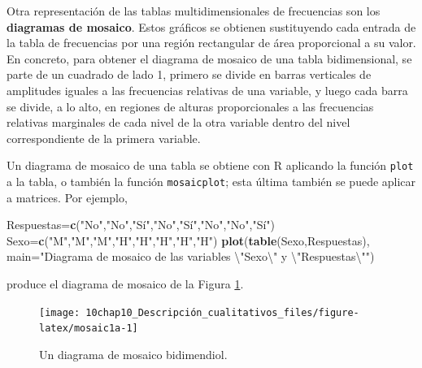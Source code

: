 \documentclass[
]{book}
\newenvironment{Shaded}{\begin{snugshade}}{\end{snugshade}}
\newcommand{\CharTok}[1]{\textcolor[rgb]{0.31,0.60,0.02}{#1}}
\newcommand{\DataTypeTok}[1]{\textcolor[rgb]{0.13,0.29,0.53}{#1}}
\newcommand{\KeywordTok}[1]{\textcolor[rgb]{0.13,0.29,0.53}{\textbf{#1}}}
\newcommand{\NormalTok}[1]{#1}
\newcommand{\StringTok}[1]{\textcolor[rgb]{0.31,0.60,0.02}{#1}}
\theoremstyle{definition}
\theoremstyle{definition}
\theoremstyle{definition}
\theoremstyle{remark}
\begin{document}
Otra representación de las tablas multidimensionales de frecuencias son los \textbf{diagramas de mosaico}. Estos gráficos se obtienen sustituyendo cada entrada de la tabla de frecuencias por una región rectangular de área proporcional a su valor. En concreto, para obtener el diagrama de mosaico de una tabla bidimensional, se parte de un cuadrado de lado 1,
primero se divide en barras verticales de amplitudes iguales a las frecuencias relativas de una variable, y luego cada barra se divide, a lo alto, en regiones de alturas proporcionales a las frecuencias relativas marginales de cada nivel de la otra variable dentro del nivel correspondiente de la primera variable.

Un diagrama de mosaico de una tabla se obtiene con R aplicando la función \texttt{plot} a la tabla, o también la función \texttt{mosaicplot}; esta última también se puede aplicar a matrices. Por ejemplo,

\begin{Shaded}
\begin{Highlighting}[]
\NormalTok{Respuestas=}\KeywordTok{c}\NormalTok{(}\StringTok{"No"}\NormalTok{,}\StringTok{"No"}\NormalTok{,}\StringTok{"Sí"}\NormalTok{,}\StringTok{"No"}\NormalTok{,}\StringTok{"Sí"}\NormalTok{,}\StringTok{"No"}\NormalTok{,}\StringTok{"No"}\NormalTok{,}\StringTok{"Sí"}\NormalTok{)}
\NormalTok{Sexo=}\KeywordTok{c}\NormalTok{(}\StringTok{"M"}\NormalTok{,}\StringTok{"M"}\NormalTok{,}\StringTok{"M"}\NormalTok{,}\StringTok{"H"}\NormalTok{,}\StringTok{"H"}\NormalTok{,}\StringTok{"H"}\NormalTok{,}\StringTok{"H"}\NormalTok{,}\StringTok{"H"}\NormalTok{)}
\KeywordTok{plot}\NormalTok{(}\KeywordTok{table}\NormalTok{(Sexo,Respuestas), }\DataTypeTok{main=}\StringTok{"Diagrama de mosaico de las variables }\CharTok{\textbackslash{}"}\StringTok{Sexo}\CharTok{\textbackslash{}"}\StringTok{ y }\CharTok{\textbackslash{}"}\StringTok{Respuestas}\CharTok{\textbackslash{}"}\StringTok{"}\NormalTok{)}
\end{Highlighting}
\end{Shaded}

produce el diagrama de mosaico de la Figura \ref{fig:mosaic1a}.

\begin{figure}

{\centering \texttt{[image: 10chap10\_Descripción\_cualitativos\_files/figure-latex/mosaic1a-1]} 

}

\caption{Un diagrama de mosaico bidimendiol.}\label{fig:mosaic1a}
\end{figure}
\end{document}

